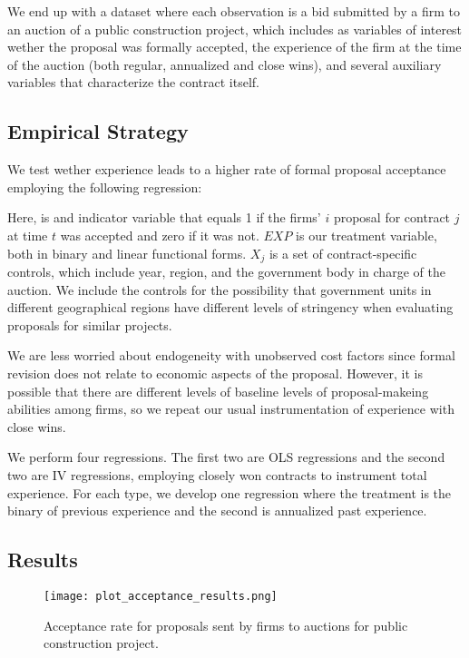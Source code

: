 We end up with a dataset where each observation is a bid submitted by a firm to an auction of a public construction project, which includes as variables of interest wether the proposal was formally accepted, the experience of the firm at the time of the auction (both regular, annualized and close wins), and several  auxiliary variables that characterize the contract itself.

\subsection{Empirical Strategy}
We test wether experience leads to a higher rate of formal proposal acceptance employing the following regression:

Here, is and indicator variable that equals 1 if the firms' $i$ proposal for contract $j$ at time $t$ was accepted and zero if it was not. $EXP$ is our treatment variable, both in binary and linear functional forms. $X_{j}$ is a set of contract-specific controls, which include year, region, and the government body in charge of the auction. We include the controls for the possibility that government units in different  geographical regions have different levels of stringency when evaluating proposals for similar projects.

We are less worried about endogeneity with unobserved cost factors since formal revision does not relate to economic aspects of the proposal. However, it is possible that there are different levels of baseline levels of proposal-makeing abilities among firms, so we repeat our usual instrumentation of experience with close wins.

We perform four regressions. The first two are OLS regressions and the second two are IV regressions, employing closely won contracts to instrument total experience. For each type, we develop one regression where the treatment is the binary of previous experience and the second is annualized past experience.

\subsection{Results}
\begin{figure}
  \texttt{[image: plot\_acceptance\_results.png]}
  \caption{Acceptance rate for proposals sent by firms to auctions for public construction project.}
  \label{fig:plot_acceptance_results}
\end{figure}


